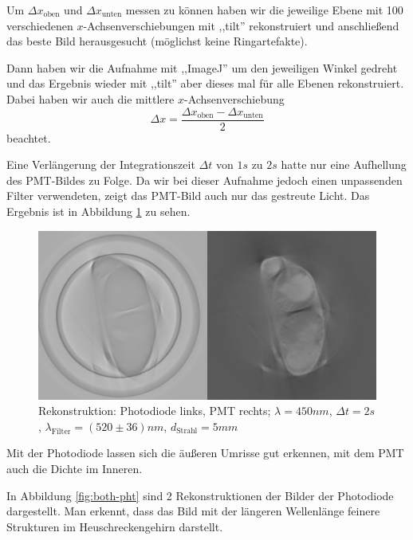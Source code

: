 Um $\Delta{x_{\text{oben}}}$ und $\Delta{x_{\text{unten}}}$ messen zu können haben wir die jeweilige Ebene mit 100 verschiedenen $x$-Achsenverschiebungen mit ,,tilt'' rekonstruiert und anschließend das beste Bild herausgesucht (möglichst keine Ringartefakte).

Dann haben wir die Aufnahme mit ,,ImageJ'' um den jeweiligen Winkel gedreht und das Ergebnis wieder mit ,,tilt'' aber dieses mal für alle Ebenen rekonstruiert.
Dabei haben wir auch die mittlere $x$-Achsenverschiebung
$$\Delta{x} = \frac{\Delta{x_{\text{oben}}} - \Delta{x_{\text{unten}}}}{2}$$
beachtet.


Eine Verlängerung der Integrationszeit $\Delta{t}$ von $1 \si{s}$ zu $2 \si{s}$ hatte nur eine Aufhellung des PMT-Bildes zu Folge.
Da wir bei dieser Aufnahme jedoch einen unpassenden Filter verwendeten, zeigt das PMT-Bild auch nur das gestreute Licht. Das Ergebnis ist in Abbildung \ref{fig:lang-int} zu sehen.

\begin{figure}[ht]
\centering
\includegraphics[width=\linewidth]{IMAGE/both-2-450-5-1.png}
\caption{Rekonstruktion: Photodiode links, PMT rechts; $\lambda = 450 \si{nm}$, $\Delta{t} = 2 \si{s}$, $\lambda_\text{Filter} = (520 \pm 36) \si{nm}$, $d_\text{Strahl} = 5 \si{mm}$}
	\label{fig:lang-int}
\end{figure}

Mit der Photodiode lassen sich die äußeren Umrisse gut erkennen, mit dem PMT auch die Dichte im Inneren.

In Abbildung \ref{fig:both-pht} sind 2 Rekonstruktionen der Bilder der Photodiode dargestellt.
Man erkennt, dass das Bild mit der längeren Wellenlänge feinere Strukturen im Heuschreckengehirn darstellt.

